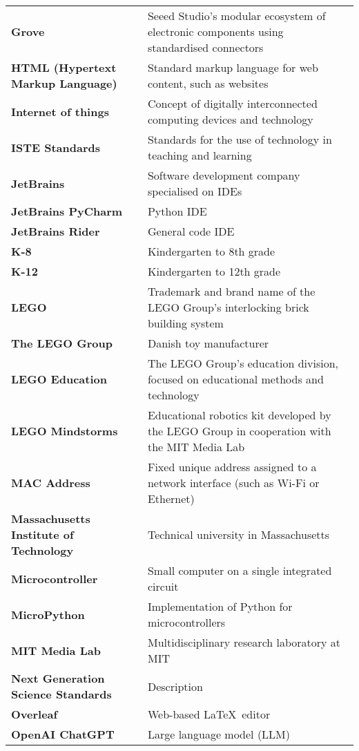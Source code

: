 {\begin{longtable}{>{\raggedright \bfseries}p{} p{}}
Grove               & Seeed Studio's modular ecosystem of electronic components using standardised connectors \\
HTML (Hypertext \quad \quad \quad Markup Language)& Standard markup language for web content, such as websites \\
Internet of things  & Concept of digitally interconnected computing devices and technology \\
ISTE Standards      & Standards for the use of technology in teaching and learning \\
JetBrains           & Software development company specialised on IDEs \\
JetBrains PyCharm   & Python IDE \\
JetBrains Rider     & General code IDE \\
K-8                 & Kindergarten to 8th grade \\
K-12                & Kindergarten to 12th grade \\
LEGO                & Trademark and brand name of the LEGO Group's interlocking brick building system \\
The LEGO Group      & Danish toy manufacturer \\
LEGO Education      & The LEGO Group's education division, focused on educational methods and technology \\
LEGO Mindstorms     & Educational robotics kit developed by the LEGO Group in cooperation with the MIT Media Lab \\
MAC Address         & Fixed unique address assigned to a network interface (such as Wi-Fi or Ethernet)\\
Massachusetts Institute of Technology & Technical university in Massachusetts \\
Microcontroller     & Small computer on a single integrated circuit \\
MicroPython         & Implementation of Python for microcontrollers \\
MIT Media Lab       & Multidisciplinary research laboratory at MIT \\
Next Generation Science Standards & Description \\
Overleaf            & Web-based \LaTeX\ editor  \\
OpenAI ChatGPT      & Large language model (LLM) \\

\end{longtable}}

